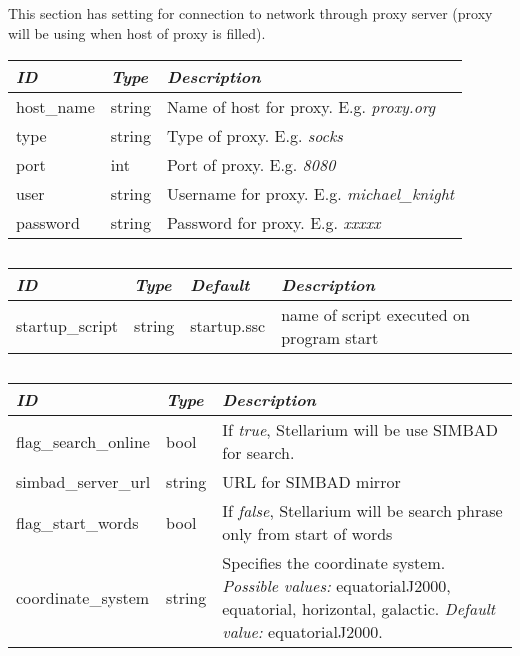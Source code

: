 \subsection{}\label{sec:config.ini:proxy}
This section has setting for connection to network through proxy server (proxy will be using when host of proxy is filled).

\begin{longtabu} to \textwidth {l|l|X}\toprule
\emph{ID}  & \emph{Type} & \emph{Description}\\\midrule
host\_name & string & Name of host for proxy. E.g. \emph{proxy.org}\\\midrule
type	   & string & Type of proxy. E.g. \emph{socks}\\\midrule
port       & int    & Port of proxy. E.g. \emph{8080}\\\midrule
user       & string & Username for proxy. E.g. \emph{michael\_knight}\\\midrule
password   & string & Password for proxy. E.g. \emph{xxxxx}\\\bottomrule
\end{longtabu}

\subsection{}\label{sec:config.ini:scripts}

\begin{longtabu} to \textwidth {l|l|l|X}\toprule
\emph{ID}                  & \emph{Type} & \emph{Default} & \emph{Description}\\\midrule
startup\_script                & string & startup.ssc & name of script executed on program start\\\bottomrule 
\end{longtabu}

\subsection{}\label{sec:config.ini:search}

\begin{longtabu} to \textwidth {l|l|X}\toprule
\emph{ID} & \emph{Type} & \emph{Description}\\\midrule
flag\_search\_online & bool   & If \emph{true}, Stellarium will be use SIMBAD for search.\\\midrule
simbad\_server\_url  & string & URL for SIMBAD mirror\\\midrule
flag\_start\_words   & bool   & If \emph{false}, Stellarium will be search phrase only from start of words\\\midrule
coordinate\_system   & string & Specifies the coordinate system. 
                                \emph{Possible values:} equatorialJ2000, equatorial, horizontal, galactic. \emph{Default value:} equatorialJ2000.\\
\bottomrule
\end{longtabu}

